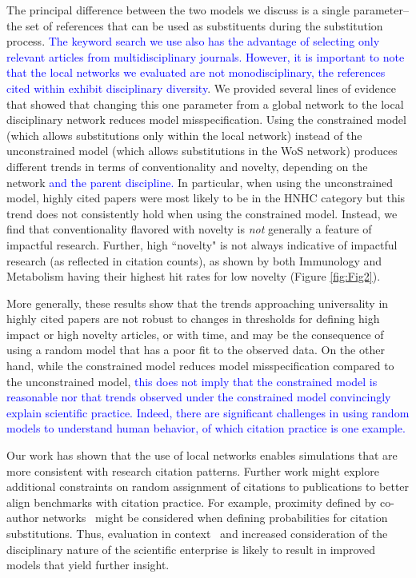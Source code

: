 \documentclass[NETN]{stjour}
\begin{document}
{The principal difference between the two models we discuss is a single parameter--the set of references that can be used as substituents during the substitution process. \textcolor{blue}{The keyword search we use also has the advantage of selecting only relevant articles from multidisciplinary journals. However, it is important to note that the local networks we evaluated are not monodisciplinary, the references cited within exhibit disciplinary diversity}. We provided several lines of evidence that showed that changing this one parameter from a global network to the local disciplinary network reduces model misspecification.  } Using the constrained model (which allows substitutions only within the local network)  instead of the unconstrained model (which allows substitutions in the WoS network) produces different trends in terms of conventionality and novelty, depending on the network \textcolor{blue}{and the parent discipline.} In particular, when using the unconstrained model, highly cited papers were most likely to be in the HNHC category but this trend does not consistently hold when using the constrained model. Instead, we find that conventionality flavored with novelty is {\em not} generally a feature of impactful research. Further,  high ``novelty" is not always indicative of impactful research (as reflected in citation counts), as shown by both Immunology and Metabolism having their highest hit rates for low novelty (Figure \ref{fig:Fig2}). 

More generally, these results show that the trends approaching universality in highly cited papers are not robust to changes in thresholds for defining high impact or high novelty articles, or with time, and may be the consequence of using a random model that has a poor fit to the observed data. On the other hand, while  the constrained model reduces model misspecification compared to the unconstrained model, \textcolor{blue}{this does not imply that the constrained model is reasonable nor that trends observed under the constrained model convincingly explain scientific practice. Indeed, there are significant  challenges in using random models to understand human behavior, of which citation practice is one example.}

Our work has shown that the use of local networks enables simulations that are more consistent with research citation patterns. Further work might explore additional constraints on random assignment of citations to publications to better align benchmarks with citation practice. For example, proximity defined by co-author networks~\citep{wallace_lariviere_gingras_2012} might be considered when defining probabilities for citation substitutions. Thus, evaluation in context~\citep{hicks_bibliometrics:_2015} and increased consideration of the disciplinary nature of the scientific enterprise is likely to result in improved models that yield further insight.
\end{document}

